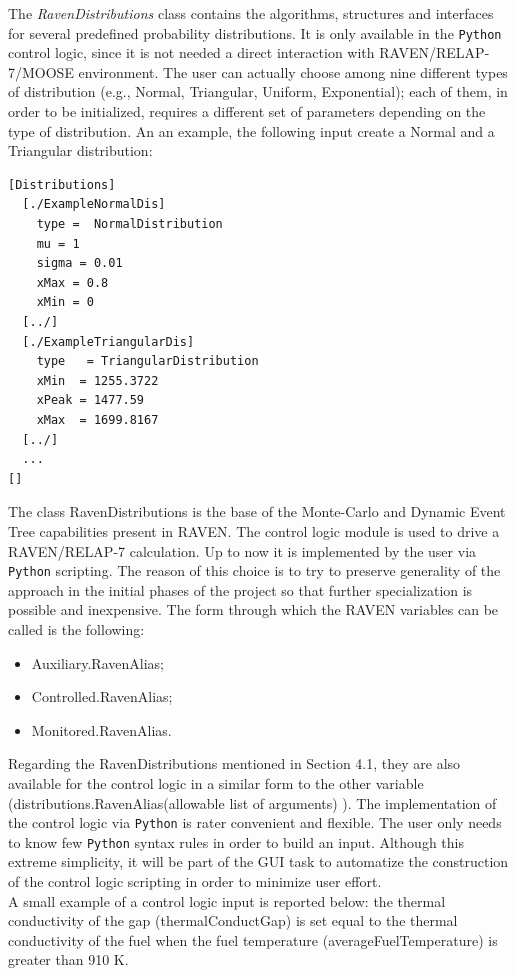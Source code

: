 \documentclass{mc2013}
\begin{document}
The \emph{RavenDistributions} class contains the algorithms, structures and interfaces for several predefined probability distributions. It is only available in the \verb!Python! control logic, since it is not needed a direct interaction with RAVEN/RELAP-7/MOOSE environment. The user can actually choose among nine different types of distribution (e.g., Normal, Triangular, Uniform, Exponential); each of them, in order to be initialized, requires a different set of parameters depending on the type of distribution.
An an example, the following input create a Normal and a Triangular distribution:
\begin{lstlisting}
[Distributions]
  [./ExampleNormalDis]
    type =  NormalDistribution
    mu = 1
    sigma = 0.01
    xMax = 0.8
    xMin = 0
  [../]
  [./ExampleTriangularDis]
    type   = TriangularDistribution
    xMin  = 1255.3722 
    xPeak = 1477.59
    xMax  = 1699.8167 
  [../]
  ...
[]
\end{lstlisting}
The class RavenDistributions is the base of the Monte-Carlo and Dynamic Event Tree capabilities present in RAVEN. 
\label{sec:pythonControlLogic} 
The control logic module is used to drive a RAVEN/RELAP-7 calculation. Up to now it is implemented by the user via \verb!Python! scripting. The reason of this choice is to try to preserve generality of the approach in the initial phases of the project so that further specialization is possible and  inexpensive.  
The form through which the RAVEN variables can be called is the following:
\begin{itemize}
  \item Auxiliary.RavenAlias;
  \item Controlled.RavenAlias;
  \item Monitored.RavenAlias.
\end{itemize}
Regarding the RavenDistributions mentioned in Section 4.1, they are also available for the control logic in a similar form to the other variable (distributions.RavenAlias(allowable list of arguments) ).
The implementation of the control logic via \verb!Python! is rater convenient and flexible. The user only needs to know few \verb!Python! syntax rules in order to build an input. Although this extreme simplicity, it will be part of the GUI task to automatize the construction of the control logic scripting in order to minimize user effort. 
\\A small example of a control logic input is reported below: the thermal conductivity of the gap (thermalConductGap) is set equal to the thermal conductivity of the fuel when the fuel temperature (averageFuelTemperature) is greater than 910 K.
\end{document}
